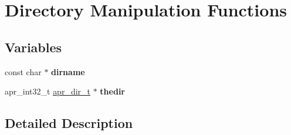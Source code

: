 \hypertarget{group__apr__dir}{}\section{Directory Manipulation Functions}
\label{group__apr__dir}
\subsection*{Variables}
\begin{DoxyCompactItemize}
\item 
\mbox{\label{group__apr__dir_gab8a2fd169b20f0b9d33959f7b17d35aa}} 
const char $\ast$ {\bfseries dirname}
\item 
\mbox{\label{group__apr__dir_gad52296d31a5d2f8307f60eed6a103209}} 
apr\+\_\+int32\+\_\+t \mbox{\hyperlink{structapr__dir__t}{apr\+\_\+dir\+\_\+t}} $\ast$ {\bfseries thedir}
\end{DoxyCompactItemize}


\subsection{Detailed Description}
